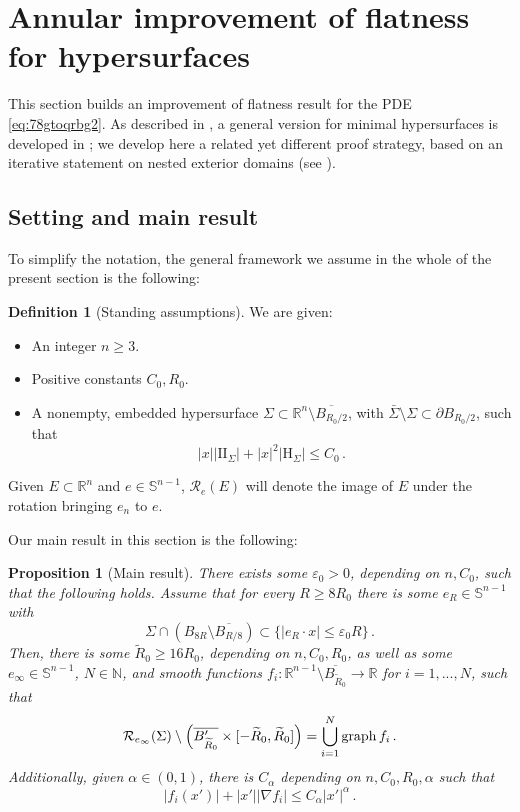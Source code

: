 \documentclass{article}
\newcommand{\N}{\mathbb{N}}
\newcommand{\R}{\mathbb{R}}
\newcommand{\Sp}{\mathbb{S}}
\newcommand{\ep}{\varepsilon}
\newtheorem{proposition}[theorem]{Proposition}
\theoremstyle{definition}
\newtheorem{definition}[theorem]{Definition}
\begin{document}
\section{Annular improvement of flatness for hypersurfaces}\label{sec:annimprovhyper}
This section builds an improvement of flatness result for the PDE \eqref{eq:78gtoqrbg2}. As described in , a general version for minimal hypersurfaces is developed in \cite{FFS25A}; we develop here a related yet different proof strategy, based on an iterative statement on nested exterior domains (see ).

\subsection{Setting and main result}
To simplify the notation, the general framework we assume in the whole of the present section is the following:
\begin{definition}[Standing assumptions]\label{def:standassumpt} We are given:
 \begin{itemize}
     \item An integer $n\geq 3$.
     \item Positive constants $C_0,R_0$.
     \item A nonempty, embedded hypersurface $\Sigma\subset \R^n\setminus \overline{B_{R_0/2}}$, with $\bar \Sigma \setminus \Sigma\subset \partial B_{R_0/2}$, such that
         \begin{equation}\label{eq:89tqrbnnbs}
        |x||\mathrm{II}_\Sigma|+ |x|^2|\mathrm{H}_\Sigma|\leq C_0\,.
    \end{equation}
 \end{itemize}
\end{definition}
Given $E\subset \R^n$ and $e\in\Sp^{n-1}$, $\mathcal R_e(E)$ will denote the image of $E$ under the rotation bringing $e_n$ to $e$.

Our main result in this section is the following:
\begin{proposition}[Main result]\label{prop:dec}
There exists some $\ep_0>0$, depending on $n,C_0$, such that the following holds. Assume that for every $R\geq 8R_0$ there is some $e_R\in\Sp^{n-1}$ with
$$\Sigma \cap (B_{8R}\setminus \overline{B_{R/8}})\subset \{|e_R\cdot x|\leq \ep_0 R\}\,.$$
Then, there is some $\widetilde R_0\geq 16R_0$, depending on $n,C_0,R_0$, as well as some $e_\infty\in\Sp^{n-1}$, $N\in\N$, and smooth functions $f_i:\R^{n-1}\setminus \overline{B_{\widetilde R_0}}\to\R$ for $i=1,...,N$, such that
$$
\mathcal R_{e_\infty}(\Sigma) \setminus \left(\overline{B_{\widetilde R_0}'}\times[-\widetilde R_0,\widetilde R_0]\right)=\bigcup_{i=1}^N {\rm graph}\, f_i\,.
$$
Additionally, given $\alpha\in(0,1)$, there is $C_\alpha$ depending on $n,C_0,R_0,\alpha$ such that
\begin{equation}\label{eq:tyahtsh9yhw}
     |f_i(x')|+|x'||\nabla f_i|\leq C_\alpha|x'|^\alpha\,.
\end{equation}
\end{proposition}
\end{document}
